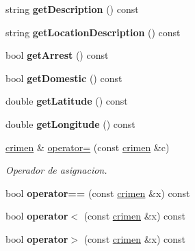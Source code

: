 \begin{DoxyCompactItemize}
\item 
\hypertarget{classcrimen_a61789d65209d167149df197272d8feba}{}string {\bfseries get\+Description} () const \label{classcrimen_a61789d65209d167149df197272d8feba}

\item 
\hypertarget{classcrimen_a9de655b3eea3592f6e5d017e83fd6060}{}string {\bfseries get\+Location\+Description} () const \label{classcrimen_a9de655b3eea3592f6e5d017e83fd6060}

\item 
\hypertarget{classcrimen_a6cab67bfdad566ce444236fc7c8df312}{}bool {\bfseries get\+Arrest} () const \label{classcrimen_a6cab67bfdad566ce444236fc7c8df312}

\item 
\hypertarget{classcrimen_a1849e7a82111773a6919318b9cf1d05d}{}bool {\bfseries get\+Domestic} () const \label{classcrimen_a1849e7a82111773a6919318b9cf1d05d}

\item 
\hypertarget{classcrimen_adfd62cd48c7d1d0259c007d3f6c39d58}{}double {\bfseries get\+Latitude} () const \label{classcrimen_adfd62cd48c7d1d0259c007d3f6c39d58}

\item 
\hypertarget{classcrimen_a0c24726cd34dc975b3fc7c664287a15c}{}double {\bfseries get\+Longitude} () const \label{classcrimen_a0c24726cd34dc975b3fc7c664287a15c}

\item 
\hyperlink{classcrimen}{crimen} \& \hyperlink{classcrimen_a612c4d3beaabd588703e4a580caf04e5}{operator=} (const \hyperlink{classcrimen}{crimen} \&c)
\begin{DoxyCompactList}\small\item\em Operador de asignacion. \end{DoxyCompactList}\item 
\hypertarget{classcrimen_aeced9ce4b7486123412975b8884d1ab7}{}bool {\bfseries operator==} (const \hyperlink{classcrimen}{crimen} \&x) const \label{classcrimen_aeced9ce4b7486123412975b8884d1ab7}

\item 
\hypertarget{classcrimen_ac865fdb9712f2426d947b1b5546b50e5}{}bool {\bfseries operator$<$} (const \hyperlink{classcrimen}{crimen} \&x) const \label{classcrimen_ac865fdb9712f2426d947b1b5546b50e5}

\item 
\hypertarget{classcrimen_ad0e1ff280d7899e9c7191b4bfc799e9d}{}bool {\bfseries operator$>$} (const \hyperlink{classcrimen}{crimen} \&x) const \label{classcrimen_ad0e1ff280d7899e9c7191b4bfc799e9d}

\end{DoxyCompactItemize}
